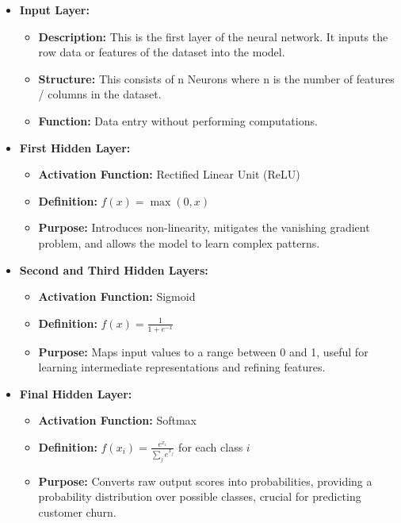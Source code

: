 \documentclass[12pt,a4paper]{article}
\begin{document}
\newpage
\begin{itemize}
    \item \textbf{Input Layer:}
    \begin{itemize}
        \item \textbf{Description:} This is the first layer of the neural network. It inputs the row data or features of the dataset into the model.
        \item \textbf{Structure:} This consists of n Neurons where n is the number of features / columns in the dataset.
        \item \textbf{Function:} Data entry without performing computations.
    \end{itemize}

    \item \textbf{First Hidden Layer:}
    \begin{itemize}
        \item \textbf{Activation Function:} Rectified Linear Unit (ReLU)
        \item \textbf{Definition:} \( f(x) = \max(0, x) \)
        \item \textbf{Purpose:} Introduces non-linearity, mitigates the vanishing gradient problem, and allows the model to learn complex patterns.
    \end{itemize}

    \item \textbf{Second and Third Hidden Layers:}
    \begin{itemize}
        \item \textbf{Activation Function:} Sigmoid
        \item \textbf{Definition:} \( f(x) = \frac{1}{1 + e^{-x}} \)
        \item \textbf{Purpose:} Maps input values to a range between 0 and 1, useful for learning intermediate representations and refining features.
    \end{itemize}

    \item \textbf{Final Hidden Layer:}
    \begin{itemize}
        \item \textbf{Activation Function:} Softmax
        \item \textbf{Definition:} \( f(x_i) = \frac{e^{x_i}}{\sum_{j} e^{x_j}} \) for each class \( i \)
        \item \textbf{Purpose:} Converts raw output scores into probabilities, providing a probability distribution over possible classes, crucial for predicting customer churn.
    \end{itemize}


\end{itemize}
\end{document}
